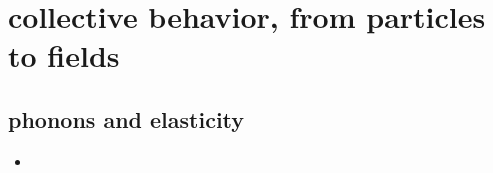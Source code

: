 \chapter{collective behavior, from particles to fields}
\section{phonons and elasticity}
\begin{itemize}
	\item 
\end{itemize}
